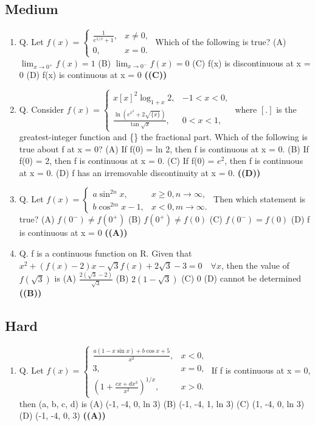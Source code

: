 \documentclass{article}
\begin{document}
\subsection{Medium}
\begin{enumerate}
\item Q. Let
$f(x) = \begin{cases} \frac{1}{e^{1/x} + 1}, & x \ne 0, \\ 0, & x = 0. \end{cases}$
Which of the following is true?
(A) $\lim_{x \to 0^+} f(x) = 1$
(B) $\lim_{x \to 0^-} f(x) = 0$
(C) f(x) is discontinuous at x = 0
(D) f(x) is continuous at x = 0 \hfill \textbf{((C))}
\item Q. Consider
$f(x) = \begin{cases} x [x]^2 \log_{1+x} 2, & -1 < x < 0, \\ \frac{\ln(e^{x^2}+2\sqrt{\{x\}})}{\tan \sqrt{x}}, & 0 < x < 1, \end{cases}$
where $[.]$ is the greatest-integer function and \{\cdot\} the fractional part. Which of the following is true about f at x = 0?
(A) If f(0) = ln 2, then f is continuous at x = 0.
(B) If f(0) = 2, then f is continuous at x = 0.
(C) If f(0) = $e^2$, then f is continuous at x = 0.
(D) f has an irremovable discontinuity at x = 0. \hfill \textbf{((D))}
\item Q. Let
$f(x) = \begin{cases} a \sin^{2n} x, & x \ge 0, n \to \infty, \\ b \cos^{2m} x - 1, & x < 0, m \to \infty. \end{cases}$
Then which statement is true?
(A) $f(0^-) \ne f(0^+)$
(B) $f(0^+) \ne f(0)$
(C) $f(0^-) = f(0)$
(D) f is continuous at x = 0 \hfill \textbf{((A))}
\item Q. f is a continuous function on R. Given that
$x^2 + (f(x) - 2)x - \sqrt{3} f(x) + 2\sqrt{3} - 3 = 0 \quad \forall x$,
then the value of $f(\sqrt{3})$ is
(A) $\frac{2(\sqrt{3}-2)}{\sqrt{3}}$
(B) $2(1 - \sqrt{3})$
(C) 0
(D) cannot be determined \hfill \textbf{((B))}
\end{enumerate}
\subsection{Hard}
\begin{enumerate}
\item Q. Let
$f(x) = \begin{cases} \frac{a(1-x \sin x) + b \cos x + 5}{x^2}, & x < 0, \\ 3, & x = 0, \\ (1+\frac{cx + dx^3}{x^2})^{1/x}, & x > 0. \end{cases}$
If f is continuous at x = 0, then (a, b, c, d) is
(A) (-1, -4, 0, ln 3)
(B) (-1, -4, 1, ln 3)
(C) (1, -4, 0, ln 3)
(D) (-1, -4, 0, 3) \hfill \textbf{((A))}
\end{enumerate}
\end{document}
